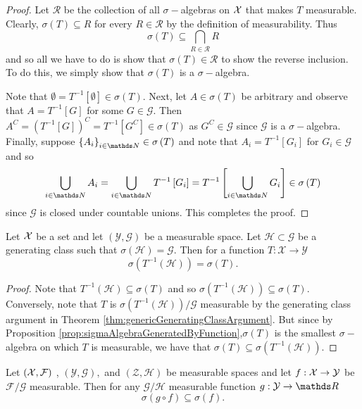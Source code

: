 \begin{proof}
Let $\mathcal{R}$ be the collection of all $\sigma-$algebras on
$\mathcal{X}$ that makes $T$ measurable. Clearly, $\sigma\left(T\right)\subseteq R$
for every $R\in\mathcal{\mathcal{R}}$ by the definition of measurability.
Thus 
\[
\sigma\left(T\right)\subseteq\bigcap_{R\in\mathcal{R}}R
\]
and so all we have to do is show that $\sigma\left(T\right)\in\mathcal{\mathcal{R}}$
to show the reverse inclusion. To do this, we simply show that $\sigma\left(T\right)$
is a $\sigma-$algebra.

Note that $\emptyset=T^{-1}\left[\emptyset\right]\in\sigma\left(T\right).$
Next, let $A\in\sigma\left(T\right)$ be arbitrary and observe that
$A=T^{-1}\left[G\right]$ for some $G\in\mathcal{G}$. Then $A^{C}=\left(T^{-1}\left[G\right]\right)^{C}=T^{-1}\left[G^{C}\right]\in\sigma\left(T\right)$
as $G^{C}\in\mathcal{G}$ since $\mathcal{G}$ is a $\sigma-$algebra.
Finally, suppose $\left\{ A_{i}\right\} _{i\in\N}\in\sigma\left(T\right)$
and note that $A_{i}=T^{-1}\left[G_{i}\right]$ for $G_{i}\in\mathcal{G}$
and so
\[
\bigcup_{i\in\N}A_{i}=\bigcup_{i\in\N}T^{-1}\left[G_{i}\right]=T^{-1}\left[\bigcup_{i\in\N}G_{i}\right]\in\sigma\left(T\right)
\]
 since $\mathcal{G}$ is closed under countable unions. This completes
the proof.
\end{proof}
\begin{cor}
\label{cor:generatorPreimage}Let $\mathcal{X}$ be a set and let $\left(\mathcal{Y},\mathcal{G}\right)$
be a measurable space. Let $\mathcal{H}\subset\mathcal{G}$ be a generating
class such that $\sigma\left(\mathcal{H}\right)=\mathcal{G}$. Then
for a function $T:\mathcal{X}\to\mathcal{Y}$
\[
\sigma\left(T^{-1}\left(\mathcal{H}\right)\right)=\sigma\left(T\right).
\]
\end{cor}

\begin{proof}
Note that $T^{-1}\left(\mathcal{H}\right)\subseteq\sigma\left(T\right)$
and so $\sigma\left(T^{-1}\left(\mathcal{H}\right)\right)\subseteq\sigma\left(T\right)$.
Conversely, note that $T$ is $\sigma\left(T^{-1}\left(\mathcal{H}\right)\right)/\mathcal{G}$
measurable by the generating class argument in Theorem \ref{thm:genericGeneratingClassArgument}.
But since by Proposition \ref{prop:sigmaAlgebraGeneratedByFunction},$\sigma\left(T\right)$
is the smallest $\sigma-$algebra on which $T$ is measurable, we
have that $\sigma\left(T\right)\subseteq\sigma\left(T^{-1}\left(\mathcal{H}\right)\right)$.
\end{proof}
\begin{prop}
\label{prop:sigmaFunctionOfMeasurableFunctionSubset}Let $\left(\mathcal{X},\mathcal{F}\right)$
, $\left(\mathcal{Y},\mathcal{G}\right),$ and $\left(\mathcal{Z},\mathcal{H}\right)$
be measurable spaces and let $f:\mathcal{X}\to\mathcal{Y}$ be $\mathcal{F}/\mathcal{G}$
measurable. Then for any $\mathcal{G}/\mathcal{H}$ measurable function
$g:\mathcal{Y}\to\R$
\[
\sigma\left(g\circ f\right)\subseteq\sigma\left(f\right).
\]
\end{prop}

